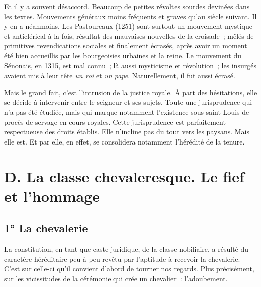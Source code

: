 \documentclass[french,twoside]{book} %
\begin{document}
Et il y a souvent désaccord. Beaucoup de petites révoltes sourdes devinées dans les textes. Mouvements généraux moins fréquents et graves qu’au siècle suivant. Il y en a néanmoins. Les Pastoureaux (1251) sont surtout un mouvement mystique et anticlérical à la fois, résultat des mauvaises nouvelles de la croisade ; mêlés de primitives revendications sociales et finalement écrasés, après avoir un moment été bien accueillis par les bourgeoisies urbaines et la reine. Le mouvement du Sénonais, en 1315, est mal connu ; là aussi mysticisme et révolution ; les insurgés avaient mis à leur tête \emph{un roi} et \emph{un pape}. Naturellement, il fut aussi écrasé.\par
Mais le grand fait, c’est l’intrusion de la justice royale. À part des hésitations, elle se décide à intervenir entre le seigneur et ses sujets. Toute une jurisprudence qui n’a pas été étudiée, mais qui marque notamment l’existence sous saint Louis de procès de servage en cours royales. Cette jurisprudence est parfaitement respectueuse des droits établis. Elle n’incline pas du tout vers les paysans. Mais elle est. Et par elle, en effet, se consolidera notamment l’hérédité de la tenure.
\section[{D. La classe chevaleresque. Le fief et l’hommage}]{D. La classe chevaleresque. Le fief et l’hommage}
\label{c07d}
\subsection[{1° La chevalerie }]{1° La chevalerie \protect\footnotemark }
\noindent La constitution, en tant que caste juridique, de la classe nobiliaire, a résulté du caractère héréditaire peu à peu revêtu par l’aptitude à recevoir la chevalerie. C’est sur celle-ci qu’il convient d’abord de tourner nos regards. Plus précisément, sur les vicissitudes de la cérémonie qui crée un chevalier : l’adoubement.\par
\end{document}
